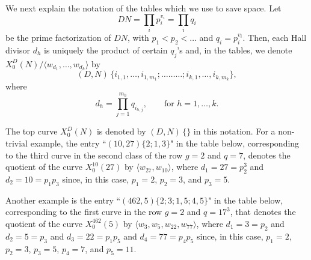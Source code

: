 \documentclass[11pt,reqno]{amsart}
\theoremstyle{definition}
\begin{document}
We next explain the notation of the tables which we use to save space. Let
\[
DN = \prod_i p_i^{v_i} = \prod_i q_i
\]
be the prime factorization of $DN$, with $p_1<p_2< \ldots$ and $q_i = p_i^{v_i}$.
Then, each Hall divisor $d_h$ is uniquely the product of certain $q_{j}$'s and, in the tables, we denote $X_0^D(N)/\langle w_{d_1},\ldots,w_{d_k}\rangle$ by 
\[
(D,N)\, \{ i_{1,1},\ldots, i_{1,m_1};\ldots \ldots \ldots; i_{k,1},\ldots, i_{k,m_k}\},
\]
where%
\[
d_h=\prod_{j=1}^{m_h} q_{i_{h,j}},\qquad\text{for }h=1,\ldots, k.
\]

The top curve $X_0^D(N)$ is denoted by $(D,N)\, \{ \}$ in this notation. For a non-trivial example, the entry ``$(10,27)\{2;1,3\}$" in the table below, corresponding to the third curve in the second class of the row $g=2$ and $q=7$, denotes the quotient of the curve $X_0^{10}(27)$ by $\langle w_{27},w_{10}\rangle$, where $d_1=27=p_2^3$ and $d_2=10=p_1 p_3$ since, in this case, $p_1=2$, $p_2=3$, and $p_3=5$. 

Another example is the entry ``$(462,5)\{2;3;1,5;4,5\}$" in the table below, corresponding to the first curve in the row $g=2$ and $q=17^3$, that denotes the quotient of the curve $X_0^{462}(5)$ by $\langle w_3,w_5,w_{22},w_{77}\rangle$, where $d_1=3=p_2$ and $d_2=5=p_3$ and $d_3=22=p_1 p_5$ and $d_4=77=p_4 p_5$ since, in this case, $p_1=2$, $p_2=3$, $p_3=5$, $p_4=7$, and $p_5=11$.



\vspace{1cm}
\end{document}
